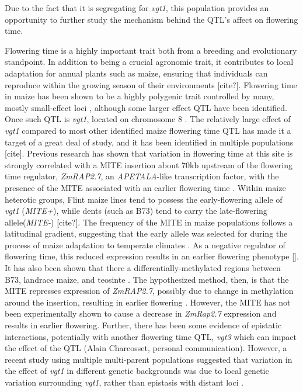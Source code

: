 \documentclass[article,9pt,twocolumn,twoside]{rilabRxiv}
\begin{document}
Due to the fact that it is segregating for \emph{vgt1}, this population provides an opportunity to further study the mechanism behind the QTL's affect on flowering time.

Flowering time is a highly important trait both from a breeding and evolutionary standpoint.
In addition to being a crucial agronomic trait, it contributes to local adaptation for annual plants such as maize, ensuring that individuals can reproduce within the growing season of their environments [cite?].
Flowering time in maize has been shown to be a highly polygenic trait controlled by many, mostly small-effect loci \cite{Buckler}, although some larger effect QTL have been identified.
Once such QTL is \emph{vgt1}, located on chromosome 8 \cite{Salvi}.
The relatively large effect of \emph{vgt1} compared to most other identified maize flowering time QTL has made it a target of a great deal of study, and it has been identified in multiple populations [cite].
Previous research  has shown that variation in flowering time at this site is strongly correlated with a MITE insertion about 70kb upstream of the flowering time regulator, \emph{ZmRAP2.7}, an \emph{APETALA}-like transcription factor, with the presence of the MITE associated with an earlier flowering time \cite{Castelletti}.
Within maize heterotic groups, Flint maize lines tend to possess the early-flowering allele of \emph{vgt1} (\emph{MITE+}), while dents (such as B73) tend to carry the late-flowering allele(\emph{MITE-}) [cite?].
The frequency of the MITE in maize populations follows a latitudinal gradient, suggesting that the early allele was selected for during the process of maize adaptation to temperate climates \cite{Navarro}.
As a negative regulator of flowering time, this reduced expression results in an earlier flowering phenotype [].
It has also been shown that there a differentially-methylated regions between B73, landrace maize, and teosinte \cite{Xu}.
The hypothesized method, then, is that the MITE represses expression of \emph{ZmRAP2.7}, possibly due to change in methylation around the insertion, resulting in earlier flowering \cite{Castelletti}.
However, the MITE has not been experimentally shown to cause a decrease in \emph{ZmRap2.7} expression and results in earlier flowering.
Further, there has been some evidence of epistatic interactions, potentially with another flowering time QTL, \emph{vgt3} which can impact the effect of the QTL (Alain Charcosset, personal communication).
However, a recent study using multiple multi-parent populations suggested that variation in the effect of \emph{vgt1} in different genetic backgrounds was due to local genetic variation surrounding \emph{vgt1}, rather than epistasis with distant loci \citep{Rio}.
\end{document}
